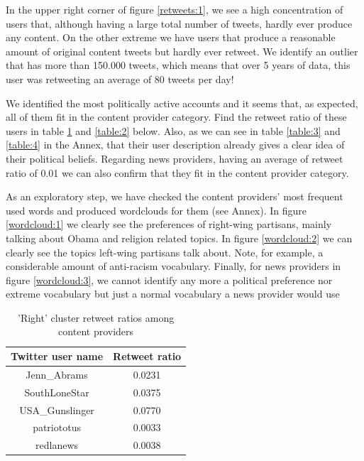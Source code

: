 \documentclass[12pt, authoryear]{elsarticle}
\begin{document}
In the upper right corner of figure  \ref{retweets:1}, we see a high concentration of users that, although having a large total number of tweets, hardly ever produce any content. On the other extreme we have users that produce a reasonable amount of original content tweets but hardly ever retweet. We identify an outlier that has more than 150.000 tweets, which means that over 5 years of data, this user was retweeting an average of 80 tweets per day!

We identified the most politically active accounts and it seems that, as expected, all of them fit in the content provider category. Find the retweet ratio of these users in table \ref{table:1} and \ref{table:2} below. Also, as we can see in table \ref{table:3} and \ref{table:4} in the Annex, that their user description already gives a clear idea of their political beliefs. Regarding news providers, having an average of retweet ratio of 0.01 we can also confirm that they fit in the content provider category.

As an exploratory step, we have checked the content providers' most frequent used words and produced wordclouds for them (see Annex). In figure \ref{wordcloud:1} we clearly see the preferences of right-wing partisans, mainly talking about Obama and religion related topics. In figure \ref{wordcloud:2} we can clearly see the topics left-wing partisans talk about. Note, for example, a considerable amount of anti-racism vocabulary. Finally, for news providers in figure \ref{wordcloud:3}, we cannot identify any more a political preference nor extreme vocabulary but just a normal vocabulary a news provider would use

\begin{center}
\begin{table}[H]
\begin{tabular}{ c c } 
Twitter user name & Retweet ratio \\
 \hline
Jenn\_Abrams	&	0.0231\\
SouthLoneStar	&	0.0375\\
USA\_Gunslinger&	0.0770\\
patriototus		&	0.0033\\
redlanews		&	0.0038\\
 \hline
\end{tabular}
\caption{'Right' cluster retweet ratios among content providers}
\label{table:1}
\end{table}
\end{center}
\end{document}
